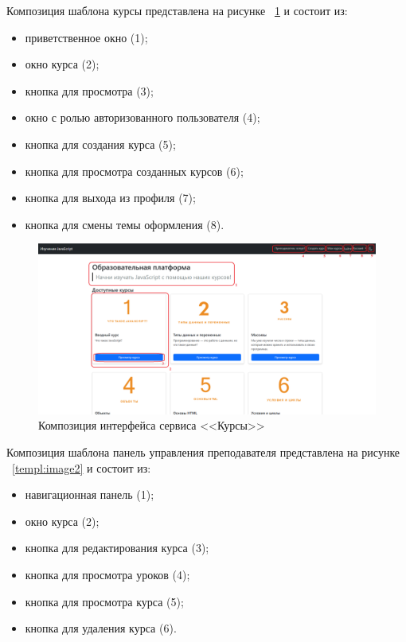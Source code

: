 Композиция шаблона курсы представлена на рисунке ~\ref{templ:image1} и состоит из:

\begin{itemize}
	\item приветственное окно (1);
	\item окно курса (2);
	\item кнопка для просмотра (3);
	\item окно с ролью авторизованного пользователя (4);
	\item кнопка для создания курса (5);
	\item кнопка для просмотра созданных курсов (6);
	\item кнопка для выхода из профиля (7);
	\item кнопка для смены темы оформления (8).
\end{itemize}

\begin{figure}[h]
	\centering
	\includegraphics[width=1\linewidth]{images/курсы}
	\caption{Композиция интерфейса сервиса <<Курсы>>}
	\label{templ:image1}
\end{figure}

Композиция шаблона панель управления преподавателя представлена на рисунке ~\ref{templ:image2} и состоит из:

\begin{itemize}
	\item навигационная панель (1);
	\item окно курса (2);
	\item кнопка для редактирования курса (3);
	\item кнопка для просмотра уроков (4);
	\item кнопка для просмотра курса (5);
	\item кнопка для удаления курса (6).
\end{itemize}

